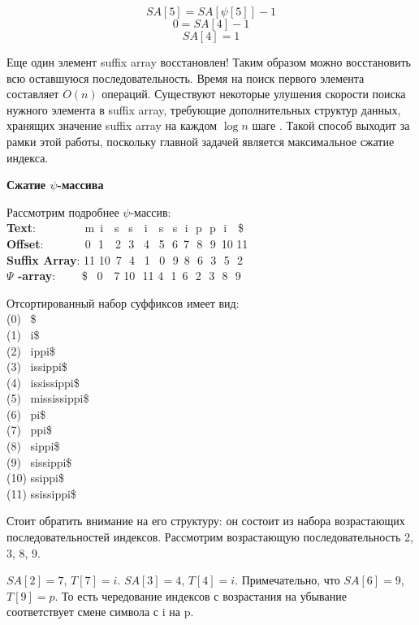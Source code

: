 \[SA[5] = SA[\psi[5]] - 1\]
\[0 = SA[4] - 1\]
\[SA[4] = 1\]

Еще один элемент suffix array восстановлен! Таким образом можно восстановить всю оставшуюся последовательность.
Время на поиск первого элемента составляет \(O(n)\) операций.
Существуют некоторые улушения скорости поиска нужного элемента в suffix array, требующие дополнительных
структур данных, хранящих значение suffix array на каждом \(\log n\) шаге \cite{andersensimple}.
Такой способ выходит за рамки этой работы, поскольку главной задачей является максимальное сжатие индекса.

\textbf{Сжатие $\psi$-массива}

Рассмотрим подробнее $\psi$-массив:
\\ \textbf{Text}:\,\,\,\,\,\,\,\,\,\,\,\,\,\,\,\,\,\,\,\,\,\,\,\, m \,i \,\,\,\,s \,\,\,s \,\,\,\,i \,\,\,\,s \,\,\,s \,\,i \,\,p \,\,p \,\,i \,\,\,\,\$
\\ \textbf{Offset}:\,\,\,\,\,\,\,\,\,\,\,\,\,\,\,\,\,\,\,\, 0 \,\,1 \,\,\,\,2 \,\,3 \,\,\,4 \,\,\,5 \,\,6 \,7 \,\,8 \,\,9 \,10 11
\\ \textbf{Suffix Array}:   11 10 \,7 \,\,4 \,\,\,1 \,\,\,0 \,\,9 \,8 \,\,6 \,\,3 \,\,5 \,\,2
\\ \textbf{$\Psi$ -array}: \,\,\,\,\,\,\,\,\,\,\,\,\$ \,\,\,0 \,\,\,\,7 10 \,\,11 4 \,\,1 \,6 \,\,2 \,\,3 \,\,8 \,\,9

Отсортированный набор суффиксов имеет вид:
\\ (0) \,\,\,\$
\\ (1) \,\,\,i\$
\\ (2) \,\,\,ippi\$
\\ (3) \,\,\,issippi\$
\\ (4) \,\,\,ississippi\$
\\ (5) \,\,\,mississippi\$
\\ (6) \,\,\,pi\$
\\ (7) \,\,\,ppi\$
\\ (8) \,\,\,sippi\$
\\ (9) \,\,\,sissippi\$
\\ (10) ssippi\$
\\ (11) ssissippi\$

Стоит обратить внимание на его структуру: он состоит из набора возрастающих последовательностей индексов.
Рассмотрим возрастающую последовательность 2, 3, 8, 9.

$SA[2] = 7$, $T[7] = i$.
$SA[3] = 4$, $T[4] = i$. Примечательно, что $SA[6] = 9$, $T[9] = p$.
То есть чередование индексов с возрастания на убывание соответствует смене символа с i на p.

